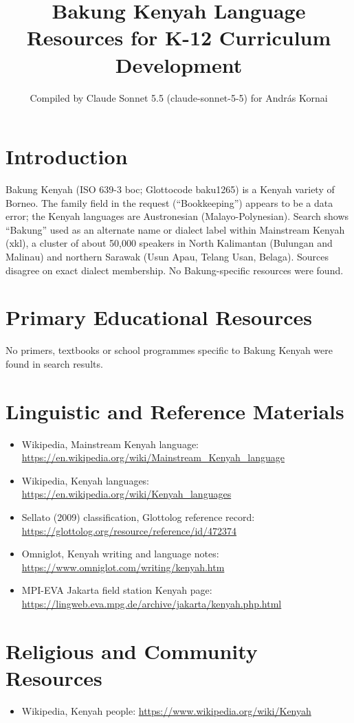 \documentclass[12pt]{article}
\title{Bakung Kenyah Language Resources for K-12 Curriculum Development}
\author{Compiled by Claude Sonnet 5.5 (claude-sonnet-5-5) for Andr\'as Kornai}
\date{}
\begin{document}
\maketitle

\section{Introduction}
Bakung Kenyah (ISO 639-3 boc; Glottocode baku1265) is a Kenyah variety of Borneo. The family field in the request (``Bookkeeping'') appears to be a data error; the Kenyah languages are Austronesian (Malayo-Polynesian). Search shows ``Bakung'' used as an alternate name or dialect label within Mainstream Kenyah (xkl), a cluster of about 50,000 speakers in North Kalimantan (Bulungan and Malinau) and northern Sarawak (Usun Apau, Telang Usan, Belaga). Sources disagree on exact dialect membership. No Bakung-specific resources were found.

\section{Primary Educational Resources}
No primers, textbooks or school programmes specific to Bakung Kenyah were found in search results.

\section{Linguistic and Reference Materials}
\begin{itemize}
\item Wikipedia, Mainstream Kenyah language: \url{https://en.wikipedia.org/wiki/Mainstream_Kenyah_language}
\item Wikipedia, Kenyah languages: \url{https://en.wikipedia.org/wiki/Kenyah_languages}
\item Sellato (2009) classification, Glottolog reference record: \url{https://glottolog.org/resource/reference/id/472374}
\item Omniglot, Kenyah writing and language notes: \url{https://www.omniglot.com/writing/kenyah.htm}
\item MPI-EVA Jakarta field station Kenyah page: \url{https://lingweb.eva.mpg.de/archive/jakarta/kenyah.php.html}
\end{itemize}

\section{Religious and Community Resources}
\begin{itemize}
\item Wikipedia, Kenyah people: \url{https://www.wikipedia.org/wiki/Kenyah}
\end{itemize}
\end{document}
